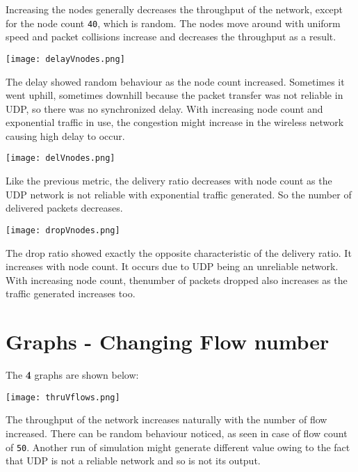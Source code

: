 \documentclass{article}
\begin{document}
Increasing the nodes generally decreases the throughput of the network, except for the node count \texttt{40}, which is random. The nodes move around with uniform speed and packet collisions increase and decreases the throughput as a result.

\begin{center}
    \texttt{[image: delayVnodes.png]}
\end{center}

The delay showed random behaviour as the node count increased. Sometimes it went uphill, sometimes downhill because the packet transfer was not reliable in UDP, so there was no synchronized delay. With increasing node count and exponential traffic in use, the congestion might increase in the wireless network causing high delay to occur.

\begin{center}
    \texttt{[image: delVnodes.png]}
\end{center}

Like the previous metric, the delivery ratio decreases with node count as the UDP network is not reliable with exponential traffic generated. So the number of delivered packets decreases. 

\begin{center}
    \texttt{[image: dropVnodes.png]}
\end{center}

The drop ratio showed exactly the opposite characteristic of the delivery ratio. It increases with node count. It occurs due to UDP being an unreliable network. With increasing node count, thenumber of packets dropped also increases as the traffic generated increases too.

\section{Graphs - Changing Flow number}
The \textbf{4} graphs are shown below:

\begin{center}
    \texttt{[image: thruVflows.png]}
\end{center}

The throughput of the network increases naturally with the number of flow increased. There can be random behaviour noticed, as seen in case of flow count of \texttt{50}. Another run of simulation might generate different value owing to the fact that UDP is not a reliable network and so is not its output.
\end{document}
